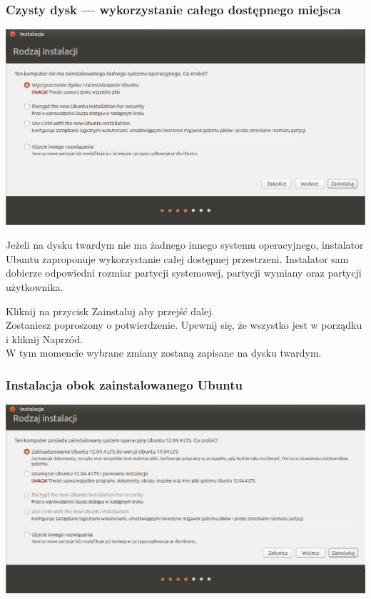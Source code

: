 \subsubsection{Czysty dysk --- wykorzystanie całego dostępnego miejsca}
\begin{center}
        \includegraphics[width=\linewidth]{images/instalator_partycjonowanie_proste.png}
\end{center}

Jeżeli na dysku twardym nie ma żadnego innego systemu operacyjnego, instalator Ubuntu zaproponuje wykorzystanie całej dostępnej przestrzeni. Instalator sam dobierze odpowiedni rozmiar partycji systemowej, partycji wymiany oraz partycji użytkownika.
\begin{flushright}
Kliknij na przycisk \textcolor{ubuntu_orange}{Zainstaluj} aby przejść dalej.\\
Zostaniesz poproszony o potwierdzenie. Upewnij się, że wszystko jest w porządku i kliknij \textcolor{ubuntu_orange}{Naprzód}.\\
W tym momencie wybrane zmiany zostaną zapisane na dysku twardym.
\end{flushright}
\clearpage
\subsubsection{Instalacja obok zainstalowanego Ubuntu}
\begin{center}
        \includegraphics[width=\linewidth]{images/instalator_partycjonowanie_obok_ubuntu.png}
\end{center}

